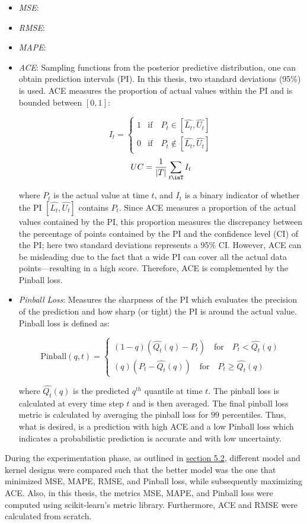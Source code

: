 \begin{itemize}
    \item \textit{MSE}: 
    \item \textit{RMSE}:
    \item \textit{MAPE}:
    \item \textit{ACE}: Sampling functions from the posterior predictive distribution, one can obtain prediction intervals (PI). In this thesis, two standard deviations (95\%) is used. ACE measures the proportion of actual values within the PI and is bounded between $[0, 1]$:
    
    $$ I_t = 
    \begin{cases}
      1 & \text{if} \quad P_t \in [\hat{L_t}, \hat{U_t}] \\
      0 & \text{if} \quad P_t \notin [\hat{L_t}, \hat{U_t}]
    \end{cases}
    $$
    $$UC = \frac{1}{|T|}\sum_{t\inT}I_t$$
    
    where $P_t$ is the actual value at time $t$, and $I_t$ is a binary indicator of whether the PI $ [\hat{L_t}, \hat{U_t}]$ contains $P_t$. Since ACE measures a proportion of the actual values contained by the PI, this proportion measures the discrepancy between the percentage of points contained by the PI and the confidence level (CI) of the PI; here two standard deviations represents a 95\% CI. However, ACE can be misleading due to the fact that a wide PI can cover all the actual data points—resulting in a high score. Therefore, ACE is complemented by the Pinball loss.
    
    \item \textit{Pinball Loss}: Measures the sharpness of the PI which evaluates the precision of the prediction and how sharp (or tight) the PI is around the actual value. Pinball loss is defined as:
    
    $$ \text{Pinball}(q, t) = 
    \begin{cases}
    (1 - q)(\hat{Q_t}(q) - P_t) \quad \text{for} \quad P_t < \hat{Q_t}(q) \\
    (q)(P_t - \hat{Q_t}(q)) \quad \text{for} \quad P_t \ge \hat{Q_t}(q) 
    \end{cases}
    $$
    
    where $\hat{Q_t}(q)$ is the predicted $q^{th}$ quantile at time $t$. The pinball loss is calculated at every time step $t$ and is then averaged. The final pinball loss metric is calculated by averaging the pinball loss for $99$ percentiles. Thus, what is desired, is a prediction with high ACE and a low Pinball loss which indicates a probabilistic prediction is accurate and with low uncertainty.
    
\end{itemize}

During the experimentation phase, as outlined in \hyperlink{subsection.5.2}{section 5.2}, different model and kernel designs were compared such that the better model was the one that minimized MSE, MAPE, RMSE, and Pinball loss, while subsequently maximizing ACE. Also, in this thesis, the metrics MSE, MAPE, and Pinball loss were computed using scikit-learn's \cite{scikit-learn} metric library. Furthermore, ACE and RMSE were calculated from scratch. 




